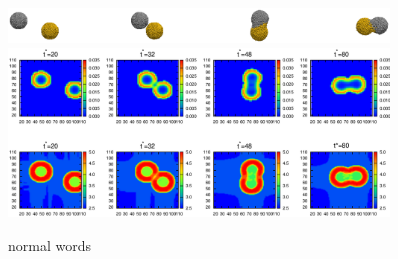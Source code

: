 \documentclass[aps,pre,preprint]{revtex4}
\begin{document}
\begin{figure}
  \centering
  \includegraphics[width=0.90\textwidth]{fig/error-rcut-ball-12.eps} 
  \includegraphics[width=0.90\textwidth]{fig/error-rcut.eps}
  \caption{normal words}
  \label{fig:tmp4}
\end{figure}
\end{document}
